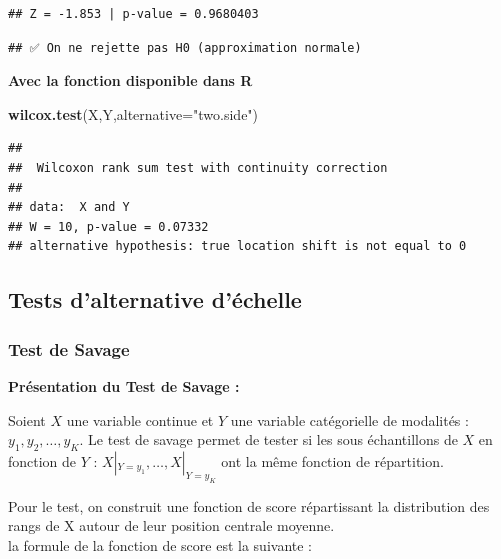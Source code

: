 \documentclass[
  12pt,
]{article}
\newenvironment{Shaded}{\begin{snugshade}}{\end{snugshade}}
\newcommand{\AttributeTok}[1]{\textcolor[rgb]{0.13,0.29,0.53}{#1}}
\newcommand{\FunctionTok}[1]{\textcolor[rgb]{0.13,0.29,0.53}{\textbf{#1}}}
\newcommand{\NormalTok}[1]{#1}
\newcommand{\SpecialCharTok}[1]{\textcolor[rgb]{0.81,0.36,0.00}{\textbf{#1}}}
\newcommand{\StringTok}[1]{\textcolor[rgb]{0.31,0.60,0.02}{#1}}
\begin{document}
\begin{verbatim}
## Z = -1.853 | p-value = 0.9680403
\end{verbatim}

\begin{Shaded}
\end{Shaded}

\begin{verbatim}
## ✅ On ne rejette pas H0 (approximation normale)
\end{verbatim}

\textbf{Avec la fonction disponible dans R}

\begin{Shaded}
\begin{Highlighting}[]
\FunctionTok{wilcox.test}\NormalTok{(X,Y,}\AttributeTok{alternative=}\StringTok{"two.side"}\NormalTok{)}
\end{Highlighting}
\end{Shaded}

\begin{verbatim}
## 
##  Wilcoxon rank sum test with continuity correction
## 
## data:  X and Y
## W = 10, p-value = 0.07332
## alternative hypothesis: true location shift is not equal to 0
\end{verbatim}

\subsection{Tests d'alternative
d'échelle}\label{tests-dalternative-duxe9chelle}

\subsubsection{Test de Savage}\label{test-de-savage}

\textbf{Présentation du Test de Savage :}

Soient \(X\) une variable continue et \(Y\) une variable catégorielle de
modalités : \(y_1, y_2, \dots , y_K\). Le test de savage permet de
tester si les sous échantillons de \(X\) en fonction de \(Y\) :
\(X|_{Y=y_1},  \ldots,  X|_{Y=y_K }\) ont la même fonction de
répartition.

Pour le test, on construit une fonction de score répartissant la
distribution des rangs de X autour de leur position centrale moyenne.\\
la formule de la fonction de score est la suivante :
\end{document}
